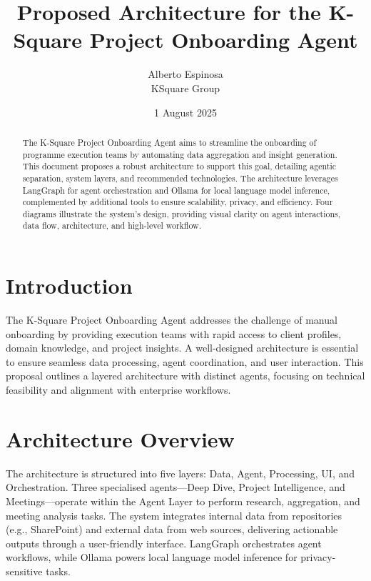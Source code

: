 \documentclass{article}
\begin{document}
\title{Proposed Architecture for the K-Square Project Onboarding Agent}
\author{Alberto Espinosa \\ KSquare Group}
\date{1 August 2025}
\maketitle

\begin{abstract}
The K-Square Project Onboarding Agent aims to streamline the onboarding of programme execution teams by automating data aggregation and insight generation. This document proposes a robust architecture to support this goal, detailing agentic separation, system layers, and recommended technologies. The architecture leverages LangGraph for agent orchestration and Ollama for local language model inference, complemented by additional tools to ensure scalability, privacy, and efficiency. Four diagrams illustrate the system’s design, providing visual clarity on agent interactions, data flow, architecture, and high-level workflow.
\end{abstract}

\section{Introduction}
The K-Square Project Onboarding Agent addresses the challenge of manual onboarding by providing execution teams with rapid access to client profiles, domain knowledge, and project insights. A well-designed architecture is essential to ensure seamless data processing, agent coordination, and user interaction. This proposal outlines a layered architecture with distinct agents, focusing on technical feasibility and alignment with enterprise workflows.

\section{Architecture Overview}
The architecture is structured into five layers: Data, Agent, Processing, UI, and Orchestration. Three specialised agents---Deep Dive, Project Intelligence, and Meetings---operate within the Agent Layer to perform research, aggregation, and meeting analysis tasks. The system integrates internal data from repositories (e.g., SharePoint) and external data from web sources, delivering actionable outputs through a user-friendly interface. LangGraph orchestrates agent workflows, while Ollama powers local language model inference for privacy-sensitive tasks.
\end{document}
